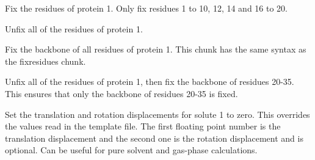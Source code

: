\documentclass[letterpaper,10pt,english]{sphinxmanual}
\begin{document}
Fix the residues of protein 1. Only fix residues 1 to 10, 12, 14 and 16 to 20.

%
\begin{sphinxVerbatim}[commandchars=\\\{\}]
   
\end{sphinxVerbatim}

Unfix all of the residues of protein 1.

\ignorespaces 
\def\sphinxLiteralBlockLabel{\label{\detokenize{protoms:index-89}}}
%
\begin{sphinxVerbatim}[commandchars=\\\{\}]
   
\end{sphinxVerbatim}

Fix the backbone of all residues of protein 1. This chunk has the same syntax as the fixresidues chunk.

%
\begin{sphinxVerbatim}[commandchars=\\\{\}]
    
\end{sphinxVerbatim}

Unfix all of the residues of protein 1, then fix the backbone of residues 20-35. This ensures that only the backbone of residues 20-35 is fixed.

%
\begin{sphinxVerbatim}[commandchars=\\\{\}]
    
\end{sphinxVerbatim}

Set the translation and rotation displacements for solute 1 to zero. This overrides the values read in the template file. The first floating point number is the translation displacement and the second one is the rotation displacement and is optional. Can be useful for pure solvent and gas-phase calculations.

\ignorespaces 
\def\sphinxLiteralBlockLabel{\label{\detokenize{protoms:index-90}}}
%
\begin{sphinxVerbatim}[commandchars=\\\{\}]
  
\end{sphinxVerbatim}
\end{document}
